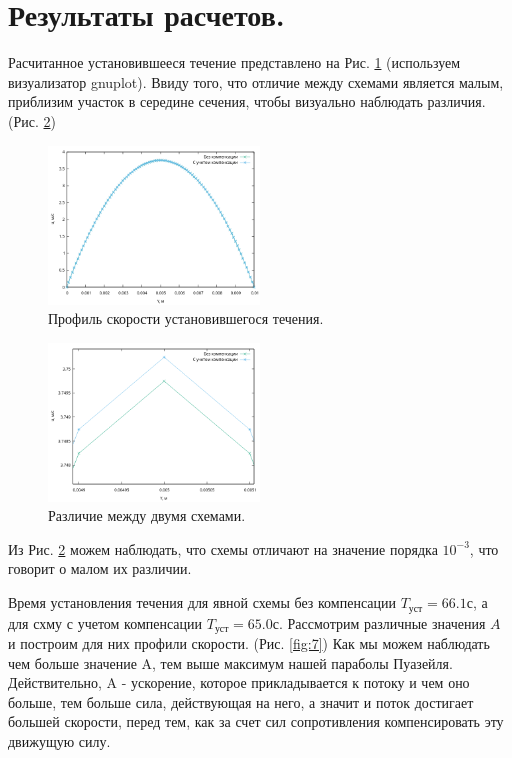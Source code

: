 \section{Результаты расчетов.}
Расчитанное установившееся течение представлено на Рис. \ref{fig:5} (используем визуализатор gnuplot).
Ввиду того, что отличие между схемами является малым, приблизим участок в середине сечения, чтобы визуально наблюдать различия. (Рис. \ref{fig:6})
\begin{figure}[H]
    \centering
    \includegraphics[width=0.5\textwidth]{images/5.png}
    \caption {Профиль скорости установившегося течения.}
    \label{fig:5}
\end{figure}

\begin{figure}[H]
    \centering
    \includegraphics[width=0.5\textwidth]{images/6.png}
    \caption {Различие между двумя схемами.}
    \label{fig:6}
\end{figure}

Из Рис. \ref{fig:6} можем наблюдать, что схемы отличают на значение порядка $10^{-3}$, что говорит о малом их различии.

Время установления течения для явной схемы без компенсации $T_\text{уст}=66.1 \text{с}$, а для схму с учетом компенсации $T_\text{уст}=65.0 \text{с}$. 
Рассмотрим различные значения $A$ и построим для них профили скорости. (Рис. \ref{fig:7}) Как мы можем наблюдать чем больше значение A, тем выше максимум нашей параболы Пуазейля. Действительно, A - ускорение, которое прикладывается к потоку и чем оно больше, тем больше сила, действующая на него, а значит и поток достигает большей скорости, перед тем, как за счет сил сопротивления компенсировать эту движущую силу. 

